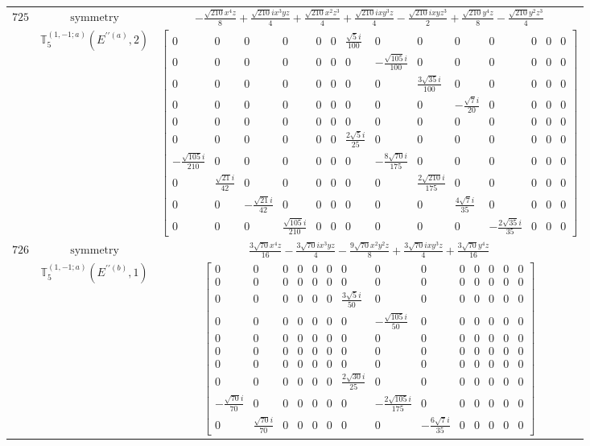 \documentclass[fleqn,8pt,landscape]{jsarticle}
\begin{document}
\begin{longtable}{ccc}
$ 725 $ & $ \text{symmetry} $ & $ - \frac{\sqrt{210} x^{4} z}{8} + \frac{\sqrt{210} i x^{3} y z}{4} + \frac{\sqrt{210} x^{2} z^{3}}{4} + \frac{\sqrt{210} i x y^{3} z}{4} - \frac{\sqrt{210} i x y z^{3}}{2} + \frac{\sqrt{210} y^{4} z}{8} - \frac{\sqrt{210} y^{2} z^{3}}{4} $ \\
$  $ & $ \mathbb{T}_{5}^{(1,-1;a)}(E^{\prime\prime(a)},2) $ & $ \begin{bmatrix} 0 & 0 & 0 & 0 & 0 & 0 & \frac{\sqrt{5} i}{100} & 0 & 0 & 0 & 0 & 0 & 0 & 0 \\ 0 & 0 & 0 & 0 & 0 & 0 & 0 & - \frac{\sqrt{105} i}{100} & 0 & 0 & 0 & 0 & 0 & 0 \\ 0 & 0 & 0 & 0 & 0 & 0 & 0 & 0 & \frac{3 \sqrt{35} i}{100} & 0 & 0 & 0 & 0 & 0 \\ 0 & 0 & 0 & 0 & 0 & 0 & 0 & 0 & 0 & - \frac{\sqrt{7} i}{20} & 0 & 0 & 0 & 0 \\ 0 & 0 & 0 & 0 & 0 & 0 & 0 & 0 & 0 & 0 & 0 & 0 & 0 & 0 \\ 0 & 0 & 0 & 0 & 0 & 0 & \frac{2 \sqrt{5} i}{25} & 0 & 0 & 0 & 0 & 0 & 0 & 0 \\ - \frac{\sqrt{105} i}{210} & 0 & 0 & 0 & 0 & 0 & 0 & - \frac{8 \sqrt{70} i}{175} & 0 & 0 & 0 & 0 & 0 & 0 \\ 0 & \frac{\sqrt{21} i}{42} & 0 & 0 & 0 & 0 & 0 & 0 & \frac{2 \sqrt{210} i}{175} & 0 & 0 & 0 & 0 & 0 \\ 0 & 0 & - \frac{\sqrt{21} i}{42} & 0 & 0 & 0 & 0 & 0 & 0 & \frac{4 \sqrt{7} i}{35} & 0 & 0 & 0 & 0 \\ 0 & 0 & 0 & \frac{\sqrt{105} i}{210} & 0 & 0 & 0 & 0 & 0 & 0 & - \frac{2 \sqrt{35} i}{35} & 0 & 0 & 0 \end{bmatrix} $ \\ \hline
$ 726 $ & $ \text{symmetry} $ & $ \frac{3 \sqrt{70} x^{4} z}{16} - \frac{3 \sqrt{70} i x^{3} y z}{4} - \frac{9 \sqrt{70} x^{2} y^{2} z}{8} + \frac{3 \sqrt{70} i x y^{3} z}{4} + \frac{3 \sqrt{70} y^{4} z}{16} $ \\
$  $ & $ \mathbb{T}_{5}^{(1,-1;a)}(E^{\prime\prime(b)},1) $ & $ \begin{bmatrix} 0 & 0 & 0 & 0 & 0 & 0 & 0 & 0 & 0 & 0 & 0 & 0 & 0 & 0 \\ 0 & 0 & 0 & 0 & 0 & 0 & 0 & 0 & 0 & 0 & 0 & 0 & 0 & 0 \\ 0 & 0 & 0 & 0 & 0 & 0 & \frac{3 \sqrt{5} i}{50} & 0 & 0 & 0 & 0 & 0 & 0 & 0 \\ 0 & 0 & 0 & 0 & 0 & 0 & 0 & - \frac{\sqrt{105} i}{50} & 0 & 0 & 0 & 0 & 0 & 0 \\ 0 & 0 & 0 & 0 & 0 & 0 & 0 & 0 & 0 & 0 & 0 & 0 & 0 & 0 \\ 0 & 0 & 0 & 0 & 0 & 0 & 0 & 0 & 0 & 0 & 0 & 0 & 0 & 0 \\ 0 & 0 & 0 & 0 & 0 & 0 & 0 & 0 & 0 & 0 & 0 & 0 & 0 & 0 \\ 0 & 0 & 0 & 0 & 0 & 0 & \frac{2 \sqrt{30} i}{25} & 0 & 0 & 0 & 0 & 0 & 0 & 0 \\ - \frac{\sqrt{70} i}{70} & 0 & 0 & 0 & 0 & 0 & 0 & - \frac{2 \sqrt{105} i}{175} & 0 & 0 & 0 & 0 & 0 & 0 \\ 0 & \frac{\sqrt{70} i}{70} & 0 & 0 & 0 & 0 & 0 & 0 & - \frac{6 \sqrt{7} i}{35} & 0 & 0 & 0 & 0 & 0 \end{bmatrix} $ \\ \hline

\end{longtable}
\end{document}
